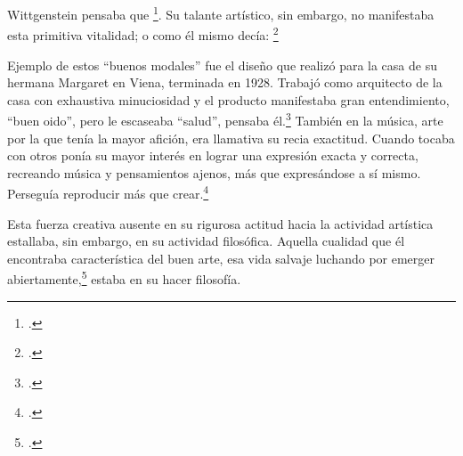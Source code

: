 
Wittgenstein pensaba que
\footcite[p.~43e]{cnv}. 
Su talante artístico, sin embargo, no manifestaba esta primitiva vitalidad; o
como él mismo decía:
\footcite[p.~29e]{cnv}

Ejemplo de estos ``buenos modales'' fue el diseño que realizó para la casa
de su hermana Margaret en Viena, terminada en 1928.
Trabajó como arquitecto de la casa con exhaustiva minuciosidad y el producto
manifestaba gran entendimiento, ``buen oido'', pero le escaseaba ``salud'',
pensaba él.\footcite[p.~43e]{cnv}
También en la música, arte por la que tenía la mayor afición, era llamativa su
recia exactitud. Cuando tocaba con otros ponía su mayor interés en lograr una
expresión exacta y correcta, recreando música y pensamientos ajenos, más que
expresándose a sí mismo. Perseguía reproducir más que
crear.\footcite[loc.˜]{monk}

Esta fuerza creativa ausente en su rigurosa actitud hacia la actividad artística
estallaba, sin embargo, en su actividad filosófica. Aquella cualidad que él
encontraba característica del buen arte, esa vida salvaje luchando por emerger
abiertamente,\footcite[cf.˜][loc.˜]{monk} estaba en su hacer filosofía.


